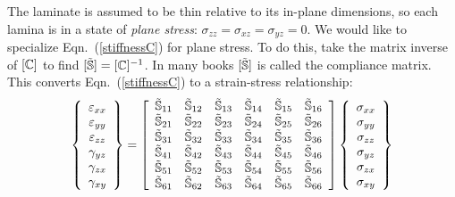 \documentclass[11pt]{article}
\begin{document}
The laminate is assumed to be thin relative to its in-plane dimensions, so each lamina is in a state of \emph{plane stress}:  $\sigma_{zz} = \sigma_{xz} = \sigma_{yz} = 0$.  We would like to specialize Eqn.~(\ref{stiffnessC}) for plane stress.  To do this, take the matrix inverse of $[ \mathbb{C} ]$ to find $[ \tilde{\mathbb{S}} ] = [ \mathbb{C} ]^{-1}$.  In many books $[ \tilde{\mathbb{S}} ]$  is called the compliance matrix.  This converts Eqn.~(\ref{stiffnessC}) to a strain-stress relationship:
\begin{equation}
        \left\{ \begin{array}{c}
           \varepsilon_{xx}  \\  \varepsilon_{yy}  \\  \varepsilon_{zz} \\  \gamma_{yz} \\ \gamma_{zx} \\  \gamma_{xy}
           \end{array} \right\}
           =
              \left[ \begin{array}{cccccc}
     \tilde{\mathbb{S}}_{11} &  \tilde{\mathbb{S}}_{12} &  \tilde{\mathbb{S}}_{13} &  \tilde{\mathbb{S}}_{14} &  \tilde{\mathbb{S}}_{15} &  \tilde{\mathbb{S}}_{16} \\
     \tilde{\mathbb{S}}_{21} &  \tilde{\mathbb{S}}_{22} &  \tilde{\mathbb{S}}_{23} &  \tilde{\mathbb{S}}_{24} &  \tilde{\mathbb{S}}_{25} &  \tilde{\mathbb{S}}_{26} \\
     \tilde{\mathbb{S}}_{31} &  \tilde{\mathbb{S}}_{32} &  \tilde{\mathbb{S}}_{33} &  \tilde{\mathbb{S}}_{34} &  \tilde{\mathbb{S}}_{35} &  \tilde{\mathbb{S}}_{36} \\
     \tilde{\mathbb{S}}_{41} &  \tilde{\mathbb{S}}_{42} &  \tilde{\mathbb{S}}_{43} &  \tilde{\mathbb{S}}_{44} &  \tilde{\mathbb{S}}_{45} &  \tilde{\mathbb{S}}_{46} \\
     \tilde{\mathbb{S}}_{51} &  \tilde{\mathbb{S}}_{52} &  \tilde{\mathbb{S}}_{53} &  \tilde{\mathbb{S}}_{54} &  \tilde{\mathbb{S}}_{55} &  \tilde{\mathbb{S}}_{56} \\
     \tilde{\mathbb{S}}_{61} &  \tilde{\mathbb{S}}_{62} &  \tilde{\mathbb{S}}_{63} &  \tilde{\mathbb{S}}_{64} &  \tilde{\mathbb{S}}_{65} &  \tilde{\mathbb{S}}_{66} 
    \end{array} \right] 
    \left\{ \begin{array}{c}
           \sigma_{xx}  \\  \sigma_{yy}  \\  \sigma_{zz} \\  \sigma_{yz} \\ \sigma_{zx} \\  \sigma_{xy}
           \end{array} \right\}
     \label{3Dcompliance}
 \end{equation}
\end{document}
